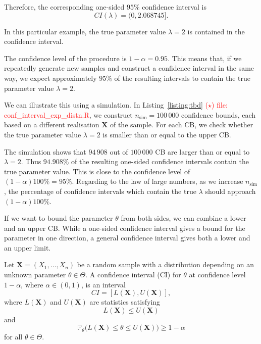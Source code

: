 \begin{example}
	Therefore, the corresponding one-sided $95\%$ confidence interval is
	\[
	CI(\lambda) = (0,2.068745].
	\]
	
	In this particular example, the true parameter value $\lambda=2$ is contained in the confidence interval.
	
	The confidence level of the procedure is $1-\alpha=0.95$. This means that, if we repeatedly generate new samples and construct a confidence interval in the same way, we expect approximately $95\%$ of the resulting intervals to contain the true parameter value $\lambda=2$.
	
	We can illustrate this using a simulation. In Listing~\ref{listing:tbd} \textcolor{red}{($\star$) file: conf\_interval\_exp\_distn.R}, we construct $n_{\text{sim}}=100\,000$ confidence bounds, each based on a different realisation $\mathbf X$ of the sample. For each CB, we check whether the true parameter value $\lambda=2$ is smaller than or equal to the upper CB.
	
	The simulation shows that $94\,908$ out of $100\,000$ CB are larger than or equal to $\lambda=2$. Thus
	\(
	94.908\%
	\)
	of the resulting one-sided confidence intervals contain the true parameter value. This is close to the confidence level of
	\(
	(1-\alpha)100\% = 95\%
	\).
	Regarding to the law of large numbers, as we increase $n_\text{sim}$, the percentage of confidence intervals which contain the true $\lambda$ should approach $(1 - \alpha)100\%$.
	
\end{example}



If we want to bound the parameter $\theta$ from both sides, we can combine a lower and an upper CB. While a one-sided confidence interval gives a bound for the parameter in one direction, a general confidence interval gives both a lower and an upper limit.

\begin{definition}
	Let $\mathbf X = (X_1, \dots, X_n)$ be a random sample with a distribution depending on an unknown parameter $\theta \in \Theta$. A confidence interval (CI) for $\theta$ at confidence level $1-\alpha$, where $\alpha \in (0,1)$, is an interval
	\[
	CI = [L(\mathbf X), U(\mathbf X)],
	\]
	where $L(\mathbf X)$ and $U(\mathbf X)$ are statistics satisfying
	\[
	L(\mathbf X) \leq U(\mathbf X)
	\]
	and
	\[
	\mathbb{P}_\theta\big(
	L(\mathbf X) \leq \theta \leq U(\mathbf X)
	\big)
	\geq 1-\alpha
	\]
	for all $\theta \in \Theta$.
\end{definition}



